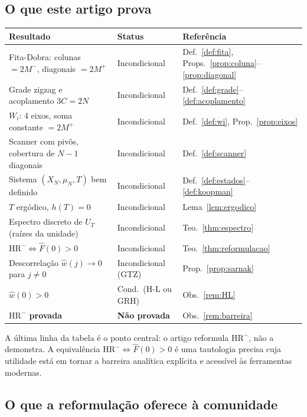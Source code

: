 \documentclass[12pt,a4paper]{article}
\theoremstyle{definition}
\newcommand{\HRm}{\mathrm{HR}^{-}}
\begin{document}
	\subsection{O que este artigo prova}
	
	\begin{center}
		\renewcommand{\arraystretch}{1.4}
		\begin{tabular}{lll}
			\toprule
			\textbf{Resultado} & \textbf{Status} & \textbf{Referência} \\
			\midrule
			Fita-Dobra: colunas $= 2M^-$, diagonais $= 2M^+$
			& Incondicional & Def.~\ref{def:fita},
			Props.~\ref{prop:coluna}--\ref{prop:diagonal} \\
			Grade zigzag e acoplamento $3C = 2N$
			& Incondicional & Def.~\ref{def:grade}--\ref{def:acoplamento} \\
			$W_i$: 4 eixos, soma constante $= 2M^+$
			& Incondicional & Def.~\ref{def:wi}, Prop.~\ref{prop:eixos} \\
			Scanner com pivôs, cobertura de $N-1$ diagonais
			& Incondicional & Def.~\ref{def:scanner} \\
			Sistema $(X_N,\mu_N,T)$ bem definido
			& Incondicional & Def.~\ref{def:estados}--\ref{def:koopman} \\
			$T$ ergódico, $h(T) = 0$
			& Incondicional & Lema~\ref{lem:ergodico} \\
			Espectro discreto de $U_T$ (raízes da unidade)
			& Incondicional & Teo.~\ref{thm:espectro} \\
			$\HRm \Leftrightarrow \widehat{F}(0) > 0$
			& Incondicional & Teo.~\ref{thm:reformulacao} \\
			Descorrelação $\widehat{w}(j) \to 0$ para $j \neq 0$
			& Incondicional (GTZ) & Prop.~\ref{prop:sarnak} \\
			$\widehat{w}(0) > 0$
			& Cond.\ (H-L ou GRH) & Obs.~\ref{rem:HL} \\
			\midrule
			\textbf{$\HRm$ provada} & \textbf{Não provada}
			& Obs.~\ref{rem:barreira} \\
			\bottomrule
		\end{tabular}
	\end{center}
	
	A última linha da tabela é o ponto central: o artigo reformula
	$\HRm$, não a demonstra. A equivalência
	$\HRm \Leftrightarrow \widehat{F}(0) > 0$ é uma tautologia
	precisa cuja utilidade está em tornar a barreira analítica
	explícita e acessível às ferramentas modernas.
	
	\subsection{O que a reformulação oferece à comunidade}
	
\end{document}
